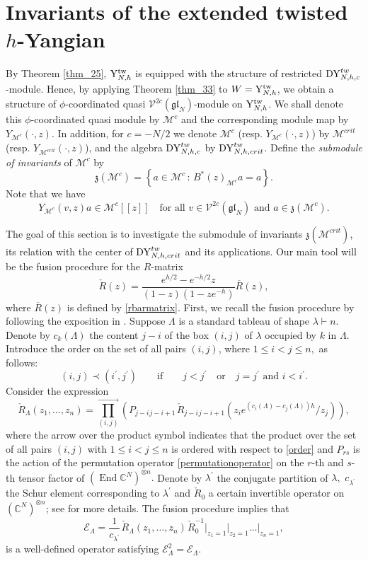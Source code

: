 \documentclass[12pt,a4paper,reqno]{amsart}
\theoremstyle{stil}
\theoremstyle{defi}
\theoremstyle{defi}
\theoremstyle{stil}
\theoremstyle{stil}
\theoremstyle{stil}
\theoremstyle{prim}
\newcommand{\wvr}{\overline}
\newcommand{\beq}{\begin{equation}}
\newcommand{\eeq}{\end{equation}}
\newcommand{\ot}{\otimes}
\newcommand{\ts}{\hspace{1pt}}
\newcommand{\ndo}{\mathop{\mathrm{End}}}
\newcommand{\R}{\wvr{R}}
\newcommand{\yhg}{{\rm Y}_{N,h}^{\text{tw}} }
\newcommand{\dyho}{{\rm DY}_{N,h,c}^{tw}  }
\newcommand{\dyhocrit}{{\rm DY}_{N,h,crit}^{tw}  }
\newcommand{\Mcc}{\mathcal{M}^{c} }
\newcommand{\Mccrit}{\mathcal{M}^{crit} }
\newcommand{\CC}{\mathbb{C}}
\newcommand{\Ec}{\mathcal{E}}
\newcommand{\Rv}{\check{R}}
\newcommand{\Vc}{\mathcal{V}^{2c}(\mathfrak{gl}_N)}
\begin{document}
\section{Invariants of the extended twisted \texorpdfstring{$h$}{h}-Yangian}\label{section_04}



By Theorem \ref{thm_25}, $\yhg$ is equipped with the structure of restricted $\dyho$-module. Hence, by applying Theorem \ref{thm_33} to  $W=\yhg$, we obtain a structure of $\phi$-coordinated quasi $\Vc$-module on $ \yhg$. We shall denote this $\phi$-coordinated quasi  module by $\Mcc$ and the corresponding module map by $Y_{\Mcc}(\cdot, z)$. In addition, for $c=-N/2$ we 
denote $\Mcc$ (resp. $Y_{\Mcc }(\cdot, z)$)
by $\Mccrit$ (resp. $Y_{\Mccrit}(\cdot, z)$), and the algebra $\dyho$    by $\dyhocrit$. 
Define the {\em submodule of invariants} of $\Mcc$ by
$$
\mathfrak{z}(\Mcc)=\left\{a\in\Mcc\,:\, B^*(z)_{\Mcc} a=a\right\}.
$$
Note that we have
$$
Y_{\Mcc}(v,z)a\in\Mcc[[z]]\quad\text{for all }v\in\Vc\text{ and } a\in\mathfrak{z}(\Mcc).
$$

The goal of this section is to investigate the submodule of invariants  $\mathfrak{z}(\Mccrit)$, its relation with the center of $\dyhocrit$ and its applications. Our main tool will be the fusion procedure   \cite{C,IMO,N} for the $R$-matrix
$$
\Rv(z)=\frac{e^{h/2}-e^{-h/2}z}{\left(1-z\right)\left(1-ze^{-h}\right)}   \R(z) ,
$$
where $\R(z)$ is defined by \eqref{rbarmatrix}. 
First, we recall the fusion procedure by following  the exposition in \cite[Sections 2, 3]{JLM0}.
Suppose  $\Lambda$ is a standard tableau of shape $\lambda\vdash n$. Denote by  $c_k(\Lambda)$ the content $j-i$ of the box $(i,j)$ of $\lambda$ occupied by $k$ in $\Lambda.$
Introduce the order on the set of all pairs $(i,j)$, where 
$1\leqslant i <j\leqslant n,$ as follows:
\beq\label{order}
(i,j )\prec (i^\prime, j^\prime)
\qquad\text{if}\qquad
j<j^\prime
\quad\text{or}\quad
j=j^\prime\text{ and }i<i^\prime .
\eeq
Consider the expression
$$
\Rv_\Lambda(z_1,\ldots ,z_n)
=
\prod_{(i,j) }^{\longrightarrow} 
\left(
P_{j-i\ts j-i+1}\ts \Rv_{j-i\ts j-i+1}(z_i e^{ (c_i(\Lambda)-c_j(\Lambda))h}/z_j)
\right),
$$
where the arrow over the product symbol indicates that the product over the set of all pairs $(i,j)$ with $1\leqslant i <j\leqslant n$ is ordered with respect to \eqref{order} and $P_{rs}$ is the action of the permutation operator \eqref{permutationoperator}
on the $r$-th and $s$-th tensor factor of $(\ndo\CC^N)^{\ot n}.$
Denote by $\lambda^\prime$   the conjugate partition of $\lambda,$ $c_{\lambda^\prime}$ the Schur element corresponding to $\lambda^\prime$ and $\check{R}_0$ a certain invertible operator on $(\CC^N)^{\ot n}$; see\cite{JLM0} for more details. The fusion procedure implies that  
$$
\Ec_\Lambda = \frac{1}{c_{\lambda^\prime}}\ts \Rv_\Lambda(z_1,\ldots ,z_n)\ts
\check{R}_0^{-1}\Big|_{z_1=1}\Big|_{z_2=1}\ldots \Big|_{z_n=1},
$$ 
is a well-defined operator satisfying $\Ec_\Lambda^2=\Ec_\Lambda.$ 
 
\end{document}
